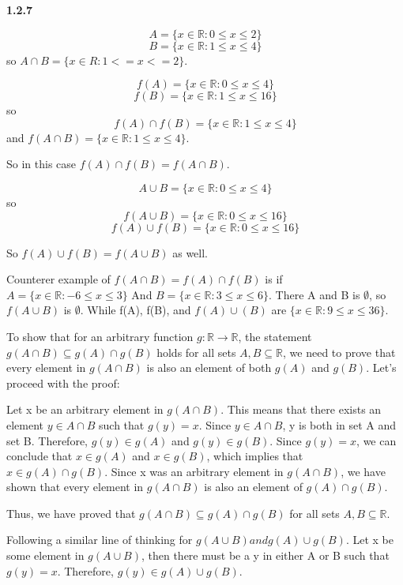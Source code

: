 \textbf{1.2.7}

$$
A = \{x \in \mathbb{R} : 0 \leq x \leq 2\}
$$
$$
B = \{x \in \mathbb{R} : 1 \leq x \leq 4\}
$$
so $A \cap B = \{x \in R : 1 <= x <= 2 \}$. 

$$
f(A) = \{ x \in \mathbb{R} : 0 \leq x \leq 4 \}
$$
$$
f(B) = \{ x \in \mathbb{R} : 1 \leq x \leq 16 \}
$$
so
$$
f(A) \cap f(B) = \{ x \in \mathbb{R} : 1 \leq x \leq 4 \}
$$
and $f(A \cap B) = \{ x \in \mathbb{R} : 1 \leq x \leq 4 \}$.

So in this case $f(A) \cap f(B) = f(A \cap B)$.

$$
A \cup B = \{x \in \mathbb{R} : 0 \leq x \leq 4\}
$$
so 
$$
f(A \cup B) = \{x \in \mathbb{R} : 0 \leq x \leq 16\}
$$
$$
f(A) \cup f(B) = \{x \in \mathbb{R} : 0 \leq x \leq 16\}
$$

So $f(A) \cup f(B) = f(A \cup B)$ as well.

Counterer example of $f(A \cap B) = f(A) \cap f(B)$ is if $A = \{x \in \mathbb{R} : -6 \leq x \leq 3\}$ And
$B = \{x \in \mathbb{R} : 3 \leq x \leq 6\}$.
There A and B is $\emptyset$, so $f(A \cup B)$ is $\emptyset$.
While f(A), f(B), and $f(A) \cup (B)$ are $\{x \in \mathbb{R} : 9 \leq x \leq 36\}$.

To show that for an arbitrary function $g: \mathbb{R} \rightarrow \mathbb{R}$, the statement
$g(A \cap B) \subseteq g(A) \cap g(B)$ holds for all sets $A, B \subseteq \mathbb{R}$,
we need to prove that every element in $g(A \cap B)$ is also an element of both $g(A)$ and $g(B)$.
Let's proceed with the proof:

Let x be an arbitrary element in $g(A \cap B)$. This means that there exists an element $y \in A \cap B$ such that $g(y) = x$.
Since $y \in A \cap B$, y is both in set A and set B. Therefore, $g(y) \in g(A)$ and $g(y) \in g(B)$.
Since $g(y) = x$, we can conclude that $x \in g(A)$ and $x \in g(B)$, which implies that $x \in g(A) \cap g(B)$.
Since x was an arbitrary element in $g(A \cap B)$, we have shown that every element in $g(A \cap B)$ is also an element of $g(A) \cap g(B)$.

Thus, we have proved that $g(A \cap B) \subseteq g(A) \cap g(B)$ for all sets $A, B \subseteq \mathbb{R}$.

Following a similar line of thinking for $g(A \cup B) and g(A) \cup g(B)$.
Let x be some element in $g(A \cup B)$, then there must be a y in either A or B such that $g(y) = x$.
Therefore, $g(y) \in g(A) \cup g(B)$.
\\~\\



